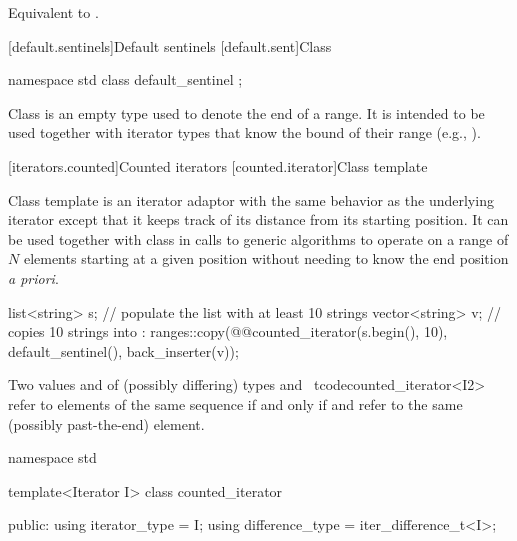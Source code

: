 \begin{addedblock}
\begin{itemdescr}
\pnum
\effects Equivalent to .
\end{itemdescr}


[default.sentinels]{Default sentinels}
[default.sent]{Class }

%
\begin{itemdecl}
namespace std {
  class default_sentinel { };
}
\end{itemdecl}

\pnum
Class  is an empty type used to denote the end of a
range. It is intended to be used together with iterator types that know the bound
of their range (e.g., ).


[iterators.counted]{Counted iterators}
[counted.iterator]{Class template }

\pnum
Class template  is an iterator adaptor
with the same behavior as the underlying iterator except that it
keeps track of its distance from its starting position. It can be
used together with class  in calls to generic
algorithms to operate on a range of $N$ elements starting at a given
position without needing to know the end position \textit{a priori}.


\pnum
\begin{example}
\begin{codeblock}
list<string> s;
// populate the list  with at least 10 strings
vector<string> v;
// copies 10 strings into :
ranges::copy(@@counted_iterator(s.begin(), 10), default_sentinel(), back_inserter(v));
\end{codeblock}
\end{example}

\pnum
Two values  and  of (possibly differing) types
and \
tcode{counted_iterator<I2>}
refer to elements of the same sequence if and only if
and
refer to the same (possibly past-the-end) element.

%
\begin{codeblock}
namespace std {
  template<Iterator I>
  class counted_iterator {
  public:
    using iterator_type = I;
    using difference_type = iter_difference_t<I>;

}}
\end{codeblock}
\end{addedblock}
